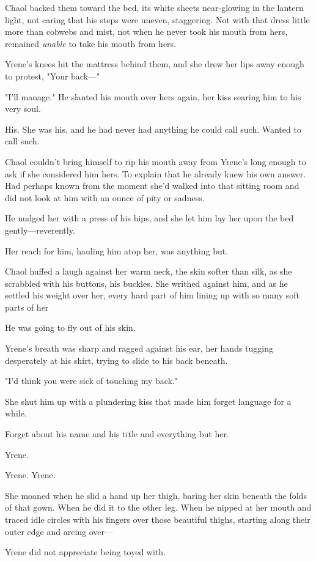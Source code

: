Chaol backed them toward the bed, its white sheets near-glowing in the lantern light, not caring that his steps were uneven, staggering. Not with that dress little more than cobwebs and mist, not when he never took his mouth from hers, remained \emph{unable} to take his mouth from hers.

Yrene's knees hit the mattress behind them, and she drew her lips away enough to protest, "Your back---"

"I'll manage." He slanted his mouth over hers again, her kiss searing him to his very soul.

His. She was his, and he had never had anything he could call such. Wanted to call such.

Chaol couldn't bring himself to rip his mouth away from Yrene's long enough to ask if she considered him hers. To explain that he already knew his own answer. Had perhaps known from the moment she'd walked into that sitting room and did not look at him with an ounce of pity or sadness.

He nudged her with a press of his hips, and she let him lay her upon the bed gently---reverently.

Her reach for him, hauling him atop her, was anything but.

Chaol huffed a laugh against her warm neck, the skin softer than silk, as she scrabbled with his buttons, his buckles. She writhed against him, and as he settled his weight over her, every hard part of him lining up with so many soft parts of her 

He was going to fly out of his skin.

Yrene's breath was sharp and ragged against his ear, her hands tugging desperately at his shirt, trying to slide to his back beneath.

"I'd think you were sick of touching my back."

She shut him up with a plundering kiss that made him forget language for a while.

Forget about his name and his title and everything but her.

Yrene.

Yrene. Yrene.

She moaned when he slid a hand up her thigh, baring her skin beneath the folds of that gown. When he did it to the other leg. When he nipped at her mouth and traced idle circles with his fingers over those beautiful thighs, starting along their outer edge and arcing over---

Yrene did not appreciate being toyed with.

